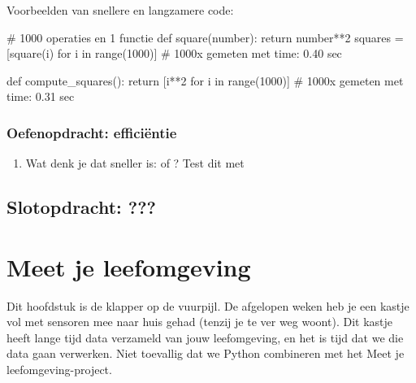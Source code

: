 \documentclass[a4paper,11pt, fleqn]{article}
\newcommand{\ditwc}{Naam van het huidige werkcollege}
\begin{document}
Voorbeelden van snellere en langzamere code:

\begin{python}
# 1000 operaties en 1 functie
def square(number):
    return number**2
squares = [square(i) for i in range(1000)]
# 1000x gemeten met time: 0.40 sec

def compute_squares():
    return [i**2 for i in range(1000)]
# 1000x gemeten met time: 0.31 sec
\end{python}

\subsubsection*{Oefenopdracht: effici\"entie}
\begin{enumerate}[label=(\alph*)]
\item Wat denk je dat sneller is:  of ? Test dit met 
\end{enumerate}


\subsection{Slotopdracht: ??? }

\clearpage
\renewcommand{\ditwc}{Meet je leefomgeving}
\section[Meet je leefomgeving]{\ditwc}
Dit hoofdstuk is de klapper op de vuurpijl. De afgelopen weken heb je een kastje vol met sensoren mee naar huis gehad (tenzij je te ver weg woont). Dit kastje heeft lange tijd data verzameld van jouw leefomgeving, en het is tijd dat we die data gaan verwerken. Niet toevallig dat we Python combineren met het Meet je leefomgeving-project. 
\end{document}
